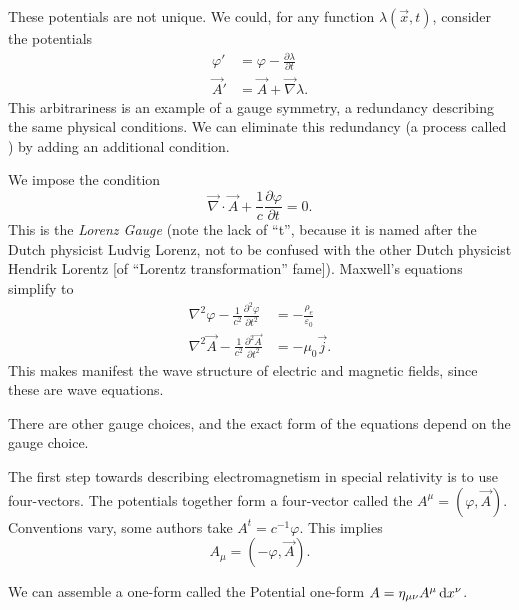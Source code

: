 These potentials are not unique. We could, for any function
$\lambda(\vec{x},t)$, consider the potentials
\begin{subequations}
\begin{align}
\varphi' &= \varphi - \frac{\partial\lambda}{\partial t}\\
\vec{A}' &= \vec{A} + \vec{\nabla}\lambda.
\end{align}
\end{subequations}
This arbitrariness is an example of a gauge symmetry, a redundancy
describing the same physical conditions. We can eliminate this
redundancy (a process called ) by adding an
additional condition.

We impose the condition
\begin{equation}
\vec{\nabla}\cdot\vec{A} + \frac{1}{c}\frac{\partial\varphi}{\partial t}=0.
\end{equation}
This is the \emph{Lorenz Gauge} (note the lack of ``t'', because it is
named after the Dutch physicist Ludvig Lorenz, not to be confused with
the other Dutch physicist Hendrik Lorentz [of ``Lorentz transformation''
fame]). Maxwell's equations
simplify to 
\begin{subequations}
\begin{align}
\nabla^{2}\varphi - \frac{1}{c^{2}}\frac{\partial^{2}\varphi}{\partial t^{2}}
&= -\frac{\rho_{e}}{\varepsilon_{0}}\\
\nabla^{2}\vec{A} - \frac{1}{c^{2}}\frac{\partial^{2}\vec{A}}{\partial t^{2}}
&= -\mu_{0}\vec{j}.
\end{align}
\end{subequations}
This makes manifest the wave structure of electric and magnetic fields,
since these are wave equations.

\begin{remark}
There are other gauge choices, and the exact form of the equations
depend on the gauge choice.
\end{remark}

The first step towards describing electromagnetism in special relativity
is to use four-vectors. The potentials together form a four-vector
called the  $A^{\mu} = (\varphi, \vec{A})$.
Conventions vary, some authors take $A^{t}=c^{-1}\varphi$. This implies
\begin{equation}
A_{\mu} = (-\varphi, \vec{A}).
\end{equation}

\begin{remark}
We can assemble a one-form called the Potential one-form
$A = \eta_{\mu\nu}A^{\mu}\,\mathrm{d} x^{\nu}$.
\end{remark}

